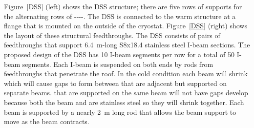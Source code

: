 Figure~\ref{DSS} (left) shows the DSS structure; there are five rows
of supports for the alternating rows
of ----.  The
DSS is connected to the warm structure at a flange that is mounted on
the outside of the cryostat.  Figure~\ref{DSS} (right) shows the
layout of these structural feedthroughs.  The DSS consists of pairs of
feedthroughs that support \SI{6.4}{m}-long S8x18.4 stainless steel I-beam
sections. The proposed design of the DSS has \num{10} I-beam segments per
row for a total of \num{50} I-beam segments. Each I-beam is suspended on
both ends by rods from feedthroughs that penetrate the roof.  In the
cold condition each beam will shrink which will cause gaps to form
between  that are adjacent but supported on separate
beams.   that are supported on the same beam will not have
gaps develop because both the beam and  are stainless
steel so they will shrink together.  Each beam is supported by a
nearly \SI{2}{m} long rod that allows the beam support to move as the beam
contracts.


